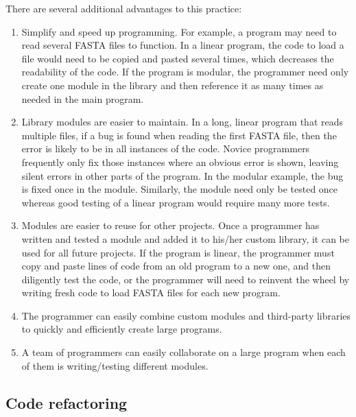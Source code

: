 \documentclass[ChapterTOCs,krantz2]{krantz} %
\begin{document}
There are several additional advantages to this practice:  
\begin{enumerate}

\item Simplify and speed up programming.  For example, a program may need to read
several FASTA files to function.  In a linear program, the
code to load a file would need to be copied and pasted several times,
which decreases the readability of the code.  If the program is modular, the
programmer need only create one module in the library and then reference it as
many times as needed in the main program.  

\item Library modules are easier to maintain.  
In a long, linear program that reads multiple files, if a bug is found when
reading the first FASTA file, then the error is likely to be in all instances
of the code.  Novice programmers frequently only fix those
instances where an obvious error is shown, leaving silent errors in other parts
of the program.  In the modular example, the bug is fixed once in the module.  
Similarly, the module need only be
tested once whereas good testing of a linear program would require many more
tests.


\item Modules are
easier to reuse for other projects.  Once a programmer has written and tested a
module and added it to his/her custom library, it
can be used for all future projects.  If the program is linear, the programmer
must copy and paste lines of code from an old program to a new one, and then
diligently test the code, or the
programmer will need to reinvent the wheel by writing fresh code to load FASTA
files for each new program.  

\item The programmer can easily combine custom
modules and third-party libraries to quickly and efficiently create large
programs.  

\item A team of programmers can easily collaborate on a large
program when each of them is writing/testing different modules.  

\end{enumerate}


\subsection{Code refactoring}
\end{document}
